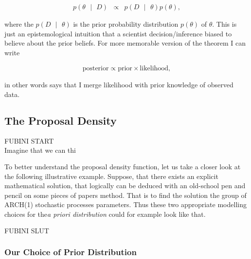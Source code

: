 \documentclass[a4paper,11pt,english]{article}
\begin{document}
			\begin{eqnarray*}
				p(\theta \text{ } |\text{ } D) &\propto& p(D \text{ } |\text{ } \theta )p(\theta),
			\end{eqnarray*}
			
			\noindent where the $p(D \text{ } |\text{ } \theta )$ is the prior probability distribution $p(\theta)$ of $\theta$. This is just an 
			epistemological intuition that a scientist decision/inference biased to believe about the prior beliefs. For more memorable version of the 
			theorem I can write
			
			\begin{eqnarray*}
				\text{posterior} \propto \text{prior} \times \text{likelihood},
			\end{eqnarray*}	 
			
			\noindent in other words says that I merge likelihood with prior knowledge of observed data.
				
		
		\subsection{The Proposal Density}
	
	
		FUBINI START \\	
		Imagine that we can thi
		
		To better understand the proposal density function, let us take a closer look at the following illustrative example. Suppose, that there exists an 
		explicit 
		mathematical solution, that logically can be deduced with an old-school pen and pencil on some pieces of papers method. That is to find the
		solution the group of ARCH(1) stochastic processes parameters. Thus these two appropriate modelling choices for the\textit{a priori distribution}
		could for example look like that. 	
	
		FUBINI SLUT \\	
	
			\subsubsection{Our Choice of Prior Distribution}
	
\end{document}
